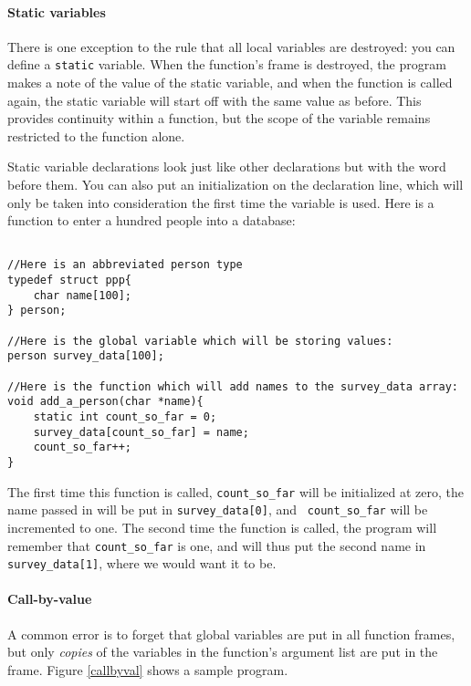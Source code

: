 \documentclass[12pt]{article}
\makeatletter
\def\ttind#1{\index{#1@{\tt #1}}{\tt #1}}
\makeatother
\begin{document}
\paragraph{Static variables} There is one exception to the rule that
all local variables are destroyed: you can define a {\tt static}
variable. When the function's frame is destroyed, the program makes a
note of the value of the  static variable, and when the function is called
again, the static variable will start off with the same value
as before. This provides continuity within a function, but the scope
of the variable remains restricted to the function alone.

Static variable declarations look just like other declarations but with
the word \ttind{static} before them. You can also put an initialization on
the declaration line, which will only be taken into consideration the
first time the variable is used. Here is a function to enter a hundred
people into a database:
\begin{verbatim}

//Here is an abbreviated person type
typedef struct ppp{
    char name[100];
} person;

//Here is the global variable which will be storing values:
person survey_data[100];

//Here is the function which will add names to the survey_data array:
void add_a_person(char *name){
    static int count_so_far = 0;
    survey_data[count_so_far] = name;
    count_so_far++;
}
\end{verbatim}

The first time this function is called, {\tt count\_so\_far} will be initialized
at zero, the name passed in will be put in {\tt survey\_data[0]}, and {\tt
count\_so\_far} will be incremented to one. The second time the function is
called, the program will remember that {\tt count\_so\_far} is one, and will thus
put the second name in {\tt survey\_data[1]}, where we would want it to be.


\paragraph{Call-by-value} 
A common error is to forget that global variables are put in all function frames,
but only {\sl copies} of the variables in the function's
argument list are put in the frame.  Figure \ref{callbyval} shows a sample program.

\end{document}
